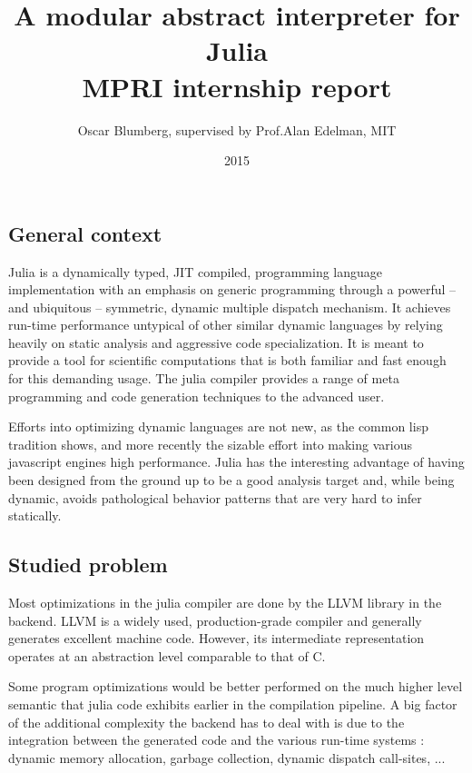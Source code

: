 \documentclass[11pt]{article}
\title{\vspace{-6ex}A modular abstract interpreter for Julia \\ MPRI internship report}
\author{Oscar Blumberg, supervised by Prof.\@ Alan Edelman, MIT}
\date{2015}
\begin{document}
\onehalfspacing
\maketitle
\thispagestyle{empty}
\vspace{1.5ex}
\subsection*{General context}

Julia\cite{julia-paper}\cite{julia-web} is a dynamically typed, JIT compiled, programming language implementation with an emphasis on generic programming through a powerful -- and ubiquitous -- symmetric, dynamic multiple dispatch mechanism. It achieves run-time performance untypical of other similar dynamic languages by relying heavily on static analysis and aggressive code specialization. It is meant to provide a tool for scientific computations that is both familiar and fast enough for this demanding usage. The julia compiler provides a range of meta programming and code generation techniques to the advanced user.

Efforts into optimizing dynamic languages are not new, as the common lisp tradition shows, and more recently the sizable effort into making various javascript engines high performance. Julia has the interesting advantage of having been designed from the ground up to be a good analysis target and, while being dynamic, avoids pathological behavior patterns that are very hard to infer statically.

\subsection*{Studied problem}

Most optimizations in the julia compiler are done by the LLVM library in the backend. LLVM is a widely used, production-grade compiler and generally generates excellent machine code. However, its intermediate representation operates at an abstraction level comparable to that of C.

Some program optimizations would be better performed on the much higher level semantic that julia code exhibits earlier in the compilation pipeline. A big factor of the additional complexity the backend has to deal with is due to the integration between the generated code and the various run-time systems : dynamic memory allocation, garbage collection, dynamic dispatch call-sites, ...
\end{document}
